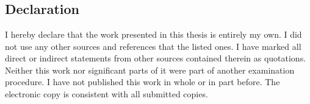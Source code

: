\chapter*{}

\section{Declaration}

I hereby declare that the work presented in this thesis is entirely my own.
I did not use any other sources and references that the listed ones. I have marked all direct or indirect
statements from other sources contained therein as quotations.
Neither this work nor significant parts of it were part of another examination procedure. I have not published
this work in whole or in part before.
The electronic copy is consistent with all submitted copies.

